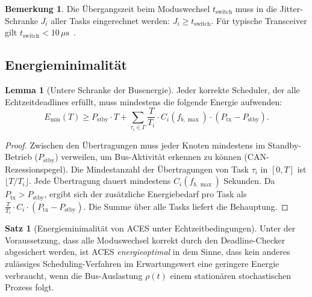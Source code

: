 ﻿\documentclass[a4paper,12pt]{article}
\theoremstyle{definition}
\newtheorem{satz}{Satz}
\newtheorem{lemma}{Lemma}
\newtheorem{bemerkung}{Bemerkung}
\begin{document}
\begin{bemerkung}
Die \"{U}bergangszeit beim Moduswechsel $t_{\mathrm{switch}}$ muss in die
Jitter-Schranke $J_i$ aller Tasks eingerechnet werden:
$J_i \geq t_{\mathrm{switch}}$.
F\"{u}r typische Transceiver gilt $t_{\mathrm{switch}} < 10\,\mu\text{s}$~\cite{nxp_tja}.
\end{bemerkung}

\subsection{Energieminimalit\"{a}t}

\begin{lemma}[Untere Schranke der Busenergie]
\label{lem:lower_energy}
Jeder korrekte Scheduler, der alle Echtzeitdeadlines erf\"{u}llt,
muss mindestens die folgende Energie aufwenden:
\[
    E_{\min}(T) \geq P_{\mathrm{stby}} \cdot T
    + \sum_{\tau_i \in \Gamma} \frac{T}{T_i} \cdot C_i(f_{b,\max}) \cdot (P_{\mathrm{tx}} - P_{\mathrm{stby}}).
\]
\end{lemma}

\begin{proof}
Zwischen den \"{U}bertragungen muss jeder Knoten mindestens im Standby-Betrieb
($P_{\mathrm{stby}}$) verweilen, um Bus-Aktivit\"{a}t erkennen zu k\"{o}nnen (CAN-Rezessionspegel).
Die Mindestanzahl der \"{U}bertragungen von Task $\tau_i$ in $[0, T]$ ist $\lfloor T / T_i \rfloor$.
Jede \"{U}bertragung dauert mindestens $C_i(f_{b,\max})$ Sekunden.
Da $P_{\mathrm{tx}} > P_{\mathrm{stby}}$, ergibt sich der zus\"{a}tzliche Energiebedarf pro Task
als $\frac{T}{T_i} \cdot C_i \cdot (P_{\mathrm{tx}} - P_{\mathrm{stby}})$.
Die Summe \"{u}ber alle Tasks liefert die Behauptung.
\end{proof}

\begin{satz}[Energieminimalit\"{a}t von ACES unter Echtzeitbedingungen]
\label{satz:optimalitaet}
Unter der Voraussetzung, dass alle Moduswechsel korrekt durch den Deadline-Checker
abgesichert werden, ist ACES \emph{energieoptimal} in dem Sinne, dass kein anderes
zul\"{a}ssiges Scheduling-Verfahren im Erwartungswert eine geringere Energie verbraucht,
wenn die Bus-Auslastung $\rho(t)$ einem station\"{a}ren stochastischen Prozess folgt.
\end{satz}
\end{document}
